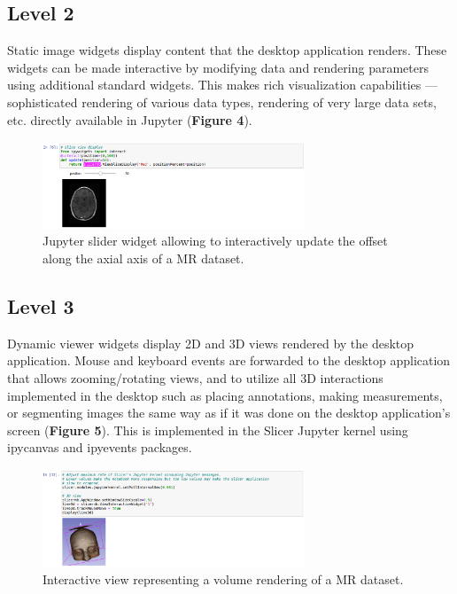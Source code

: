 \documentclass{IEEEcsmag}
\begin{document}
\subsection{Level 2}

Static image widgets display content that the desktop application renders. These widgets can be made interactive by modifying data and rendering parameters using additional standard widgets. This makes rich visualization capabilities — sophisticated rendering of various data types, rendering of very large data sets, etc. directly available in Jupyter ({\bf Figure 4}).

\begin{figure}
\centerline{\includegraphics[width=18.5pc]{figure4_slider_update.png}}
\caption{Jupyter slider widget allowing to interactively update the offset along the  axial axis of a MR dataset.}
\end{figure}

\subsection{Level 3}

Dynamic viewer widgets display 2D and 3D views rendered by the desktop application. Mouse and keyboard events are forwarded to the desktop application that allows zooming/rotating views, and to utilize all 3D interactions implemented in the desktop such as placing annotations, making measurements, or segmenting images the same way as if it was done on the desktop application’s screen ({\bf Figure 5}). This is implemented in the Slicer Jupyter kernel using ipycanvas \cite{ipycanvas} and ipyevents \cite{ipyevents} packages.

\begin{figure}
\centerline{\includegraphics[width=18.5pc]{figure5_interactive_3d.png}}
\caption{Interactive view representing a volume rendering of a MR dataset.}
\end{figure}
\end{document}
